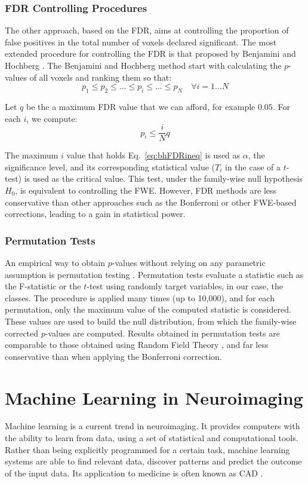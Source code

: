 \subsubsection{FDR Controlling Procedures}
The other approach, based on the \ac{FDR}, aims at controlling the proportion of false positives in the total number of voxels declared significant. The most extended procedure for controlling the \ac{FDR} is that proposed by Benjamini and Hochberg \cite{Benjamini1995}. The Benjamini and Hochberg method start with calculating the $p$-values of all voxels and ranking them so that:
\begin{equation}
p_1 \leq p_2 \leq \dots \leq p_i \leq \dots \leq p_N \quad \forall i=1\dots N
\end{equation}

Let $q$ be the a maximum \ac{FDR} value that we can afford, for example $0.05$. For each $i$, we compute:
\begin{equation}\label{eq:bhFDRineq}
p_i \leq \frac{i}{N}q
\end{equation}

The maximum $i$ value that holds Eq.~\ref{eq:bhFDRineq} is used as $\alpha$, the significance level, and its corresponding statistical value ($T_i$ in the case of a $t$-test) is used as the critical value. This test, under the family-wise null hypothesis $H_0$, is equivalent to controlling the \ac{FWE}. However, \ac{FDR} methods are less conservative than other approaches such as the Bonferroni or other \ac{FWE}-based corrections, leading to a gain in statistical power. 


\subsubsection{Permutation Tests}
An empirical way to obtain $p$-values without relying on any parametric assumption is permutation testing \cite{Anderson2001,Winkler2014}. Permutation tests evaluate a statistic such as the F-statistic or the $t$-test using randomly target variables, in our case, the classes. The procedure is applied many times (up to 10,000), and for each permutation, only the maximum value of the computed statistic is considered. These values are used to build the null distribution, from which the family-wise corrected $p$-values are computed. Results obtained in permutation tests are comparable to those obtained using Random Field Theory \cite{Winkler2014}, and far less conservative than when applying the Bonferroni correction. 

\section{Machine Learning in Neuroimaging}\label{sec:machinelearning}
Machine learning is a current trend in neuroimaging. It provides computers with the ability to learn from data, using a set of statistical and computational tools. Rather than being explicitly programmed for a certain task, machine learning systems are able to find relevant data, discover patterns and predict the outcome of the input data. Its application to medicine is often known as \acf{CAD} \cite{Martinez-Murcia2016}. 

